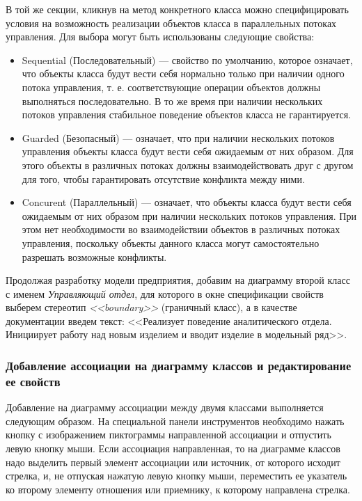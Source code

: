 \documentclass[a4paper,12pt]{extreport}
\begin{document}
В той же секции, кликнув на метод конкретного класса можно специфицировать условия на возможность реализации объектов класса в параллельных потоках управления. Для выбора могут быть использованы следующие свойства:
\begin{itemize}
	\item Sequential (Последовательный) --- свойство по умолчанию, которое означает, что объекты класса будут вести себя нормально только при наличии одного потока управления, т. е. соответствующие операции объектов должны выполняться последовательно. В то же время при наличии нескольких потоков управления стабильное поведение объектов класса не гарантируется.
	\item Guarded (Безопасный) --- означает, что при наличии нескольких потоков управления объекты класса будут вести себя ожидаемым от них образом. Для этого объекты в различных потоках должны взаимодействовать друг с другом для того, чтобы гарантировать отсутствие конфликта между ними.
	\item Concurent (Параллельный) --- означает, что объекты класса будут вести себя ожидаемым от них образом при наличии нескольких потоков управления. При этом нет необходимости во взаимодействии объектов в различных потоках управления, поскольку объекты данного класса могут  самостоятельно разрешать возможные конфликты.
\end{itemize}
Продолжая разработку модели предприятия, добавим на диаграмму второй класс с именем \textit{Управляющий отдел}, для которого в окне спецификации свойств выберем стереотип \textit{<<boundary>>} (граничный класс), а в качестве документации введем текст: <<Реализует поведение аналитического отдела. Инициирует работу над новым изделием и вводит изделие в модельный ряд>>.


\subsubsection*{Добавление ассоциации на диаграмму классов и редактирование ее свойств}
Добавление на диаграмму ассоциации между двумя классами выполняется следующим образом. На специальной панели инструментов необходимо нажать кнопку с изображением пиктограммы направленной ассоциации и отпустить левую кнопку мыши. Если ассоциация направленная, то на диаграмме классов надо выделить первый элемент ассоциации или источник, от которого исходит стрелка, и, не отпуская нажатую левую кнопку мыши, переместить ее указатель ко второму элементу отношения или приемнику, к которому направлена стрелка.
\end{document}
